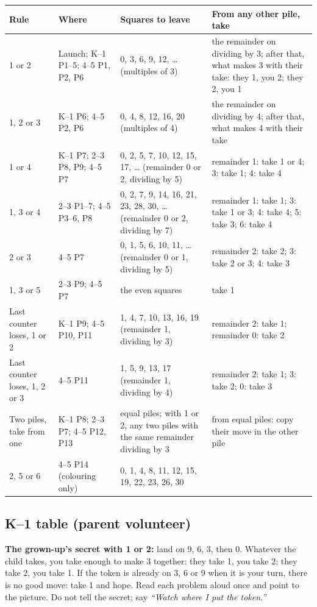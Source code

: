 \documentclass[10pt]{article}
\newcommand{\hd}{\rowcolor{head}}
\newcommand{\shaded}[1]{\par\noindent\colorbox{box}{\parbox{\dimexpr\linewidth-2\fboxsep}{#1}}\par}
\begin{document}
\noindent\begin{tabularx}{\linewidth}{@{}L{1.05in}L{1.45in}L{2.15in}Y@{}}
\toprule
\hd Rule & Where & Squares to leave & From any other pile, take \\
 or 2 & Launch; K--1 P1--5; 4--5 P1, P2, P6 & 0, 3, 6, 9, 12, \dots{} (multiples of 3) & the remainder on dividing by 3; after that, what makes 3 with their take: they 1, you 2; they 2, you 1 \\
1, 2 or 3 & K--1 P6; 4--5 P2, P6 & 0, 4, 8, 12, 16, 20 (multiples of 4) & the remainder on dividing by 4; after that, what makes 4 with their take \\
1 or 4 & K--1 P7; 2--3 P8, P9; 4--5 P7 & 0, 2, 5, 7, 10, 12, 15, 17, \dots{} (remainder 0 or 2, dividing by 5) & remainder 1: take 1 or 4; 3: take 1; 4: take 4 \\
1, 3 or 4 & 2--3 P1--7; 4--5 P3--6, P8 & 0, 2, 7, 9, 14, 16, 21, 23, 28, 30, \dots{} (remainder 0 or 2, dividing by 7) & remainder 1: take 1; 3: take 1 or 3; 4: take 4; 5: take 3; 6: take 4 \\
2 or 3 & 4--5 P7 & 0, 1, 5, 6, 10, 11, \dots{} (remainder 0 or 1, dividing by 5) & remainder 2: take 2; 3: take 2 or 3; 4: take 3 \\
1, 3 or 5 & 2--3 P9; 4--5 P7 & the even squares & take 1 \\
Last counter loses, 1 or 2 & K--1 P9; 4--5 P10, P11 & 1, 4, 7, 10, 13, 16, 19 (remainder 1, dividing by 3) & remainder 2: take 1; remainder 0: take 2 \\
Last counter loses, 1, 2 or 3 & 4--5 P11 & 1, 5, 9, 13, 17 (remainder 1, dividing by 4) & remainder 2: take 1; 3: take 2; 0: take 3 \\
Two piles, take from one & K--1 P8; 2--3 P7; 4--5 P12, P13 & equal piles; with 1 or 2, any two piles with the same remainder dividing by 3 & from equal piles: copy their move in the other pile \\
2, 5 or 6 & 4--5 P14 (colouring only) & 0, 1, 4, 8, 11, 12, 15, 19, 22, 23, 26, 30 & \\
\bottomrule
\end{tabularx}

\subsection{K--1 table (parent volunteer)}

\shaded{\textbf{The grown-up's secret with 1 or 2:} land on 9, 6, 3, then 0.
Whatever the child takes, you take enough to make 3 together: they take 1, you
take 2; they take 2, you take 1. If the token is already on 3, 6 or 9 when it
is your turn, there is no good move: take 1 and hope. Read each problem aloud
once and point to the picture. Do not tell the secret; say \textit{``Watch
where I put the token.''}}
\end{document}

